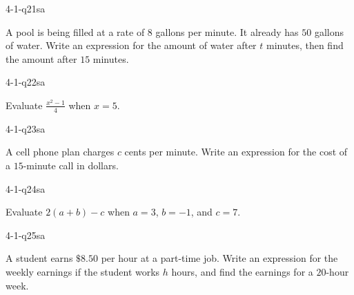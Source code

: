 \begin{practiceQuestion}{4-1-q21}{sa}
\begin{questionText}
A pool is being filled at a rate of $8$ gallons per minute. It already has $50$ gallons of water. Write an expression for the amount of water after $t$ minutes, then find the amount after $15$ minutes.
\end{questionText}
\end{practiceQuestion}

\begin{practiceQuestion}{4-1-q22}{sa}
\begin{questionText}
Evaluate $\frac{x^2 - 1}{4}$ when $x = 5$.
\end{questionText}
\end{practiceQuestion}

\begin{practiceQuestion}{4-1-q23}{sa}
\begin{questionText}
A cell phone plan charges $c$ cents per minute. Write an expression for the cost of a $15$-minute call in dollars.
\end{questionText}
\end{practiceQuestion}

\begin{practiceQuestion}{4-1-q24}{sa}
\begin{questionText}
Evaluate $2(a + b) - c$ when $a = 3$, $b = -1$, and $c = 7$.
\end{questionText}
\end{practiceQuestion}

\begin{practiceQuestion}{4-1-q25}{sa}
\begin{questionText}
A student earns $\$8.50$ per hour at a part-time job. Write an expression for the weekly earnings if the student works $h$ hours, and find the earnings for a $20$-hour week.
\end{questionText}
\end{practiceQuestion}


